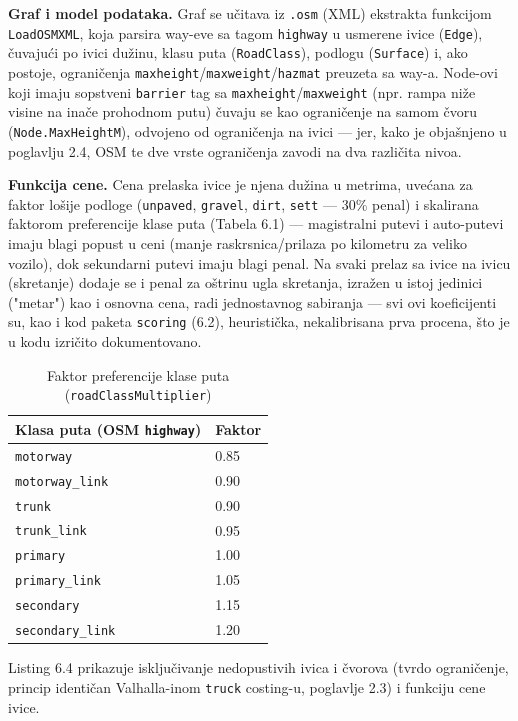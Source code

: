 \textbf{Graf i model podataka.} Graf se učitava iz \texttt{.osm} (XML) ekstrakta funkcijom \texttt{LoadOSMXML}, koja parsira way-eve sa tagom \texttt{highway} u usmerene ivice (\texttt{Edge}), čuvajući po ivici dužinu, klasu puta (\texttt{RoadClass}), podlogu (\texttt{Surface}) i, ako postoje, ograničenja \texttt{maxheight}/\texttt{maxweight}/\texttt{hazmat} preuzeta sa way-a. Node-ovi koji imaju sopstveni \texttt{barrier} tag sa \texttt{maxheight}/\texttt{maxweight} (npr. rampa niže visine na inače prohodnom putu) čuvaju se kao ograničenje na samom čvoru (\texttt{Node.MaxHeightM}), odvojeno od ograničenja na ivici — jer, kako je objašnjeno u poglavlju 2.4, OSM te dve vrste ograničenja zavodi na dva različita nivoa.

\textbf{Funkcija cene.} Cena prelaska ivice je njena dužina u metrima, uvećana za faktor lošije podloge (\texttt{unpaved}, \texttt{gravel}, \texttt{dirt}, \texttt{sett} — 30\% penal) i skalirana faktorom preferencije klase puta (Tabela 6.1) — magistralni putevi i auto-putevi imaju blagi popust u ceni (manje raskrsnica/prilaza po kilometru za veliko vozilo), dok sekundarni putevi imaju blagi penal. Na svaki prelaz sa ivice na ivicu (skretanje) dodaje se i penal za oštrinu ugla skretanja, izražen u istoj jedinici ("metar") kao i osnovna cena, radi jednostavnog sabiranja — svi ovi koeficijenti su, kao i kod paketa \texttt{scoring} (6.2), heuristička, nekalibrisana prva procena, što je u kodu izričito dokumentovano.

\begin{longtable}{@{}p{}p{}@{}}
\caption{Faktor preferencije klase puta (\texttt{roadClassMultiplier})}\label{tab:6-1}\\
\toprule
\textbf{Klasa puta (OSM \texttt{highway})} & \textbf{Faktor} \\
\midrule
\endhead
\texttt{motorway} & 0.85 \\
\texttt{motorway\_link} & 0.90 \\
\texttt{trunk} & 0.90 \\
\texttt{trunk\_link} & 0.95 \\
\texttt{primary} & 1.00 \\
\texttt{primary\_link} & 1.05 \\
\texttt{secondary} & 1.15 \\
\texttt{secondary\_link} & 1.20 \\
\bottomrule
\end{longtable}

Listing 6.4 prikazuje isključivanje nedopustivih ivica i čvorova (tvrdo ograničenje, princip identičan Valhalla-inom \texttt{truck} costing-u, poglavlje 2.3) i funkciju cene ivice.

